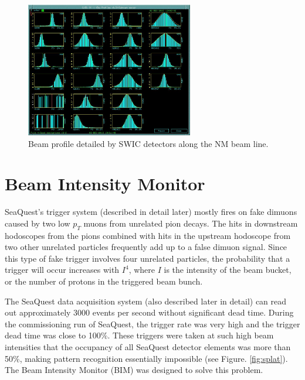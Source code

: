 \begin{figure}
	\begin{center}
		\includegraphics[width=0.65\textwidth]{figures/swic.jpg}
		\caption{Beam profile detailed by SWIC detectors along the NM beam line.}
		\label{fig:Profile}
	\end{center}
\end{figure}

\section{Beam Intensity Monitor}

SeaQuest's trigger system (described in detail later) mostly fires on fake dimuons caused by two low $p_T$ muons from
unrelated pion decays. The hits in downstream hodoscopes from the pions combined with hits in the upstream
hodoscope from two other unrelated particles frequently add up to a false dimuon signal. Since this type of fake
trigger involves four unrelated particles, the probability that a trigger will occur increases with $I^4$, where
$I$ is the intensity of the beam bucket, or the number of protons in the triggered beam bunch.

The SeaQuest data acquisition system (also described later in detail) can read out approximately 3000 events per
second without significant dead time.  During the commissioning run of SeaQuest, the trigger rate was very high and the
trigger dead time was close to 100\%.  These triggers were taken at such high beam intensities that the occupancy
of all SeaQuest detector elements was more than 50$\%$, making pattern recognition essentially impossible
(see Figure. \ref{fig:splat}). The Beam Intensity Monitor (BIM) was designed to solve this problem.

